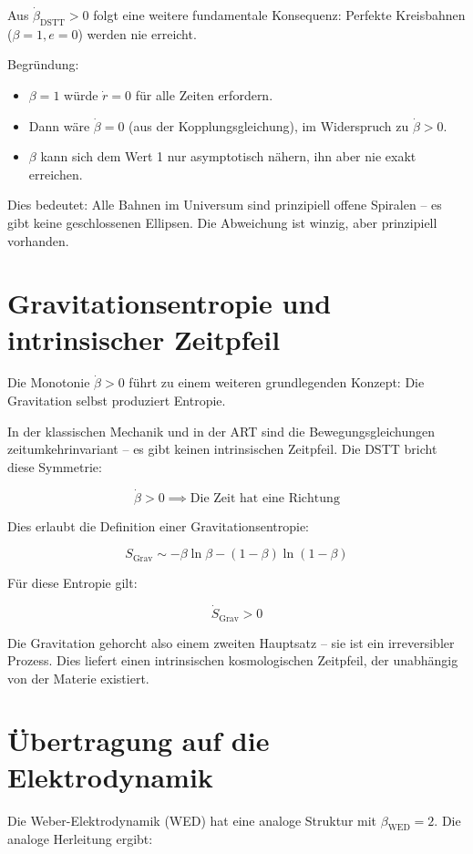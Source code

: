 Aus \(\dot{\beta}_{\text{DSTT}} > 0\) folgt eine weitere fundamentale Konsequenz: Perfekte Kreisbahnen (\(\beta = 1, e = 0\)) werden nie erreicht.

Begründung:
\begin{itemize}
    \item \(\beta = 1\) würde \(\dot{r} = 0\) für alle Zeiten erfordern.
    \item Dann wäre \(\dot{\beta} = 0\) (aus der Kopplungsgleichung), im Widerspruch zu \(\dot{\beta} > 0\).
    \item \(\beta\) kann sich dem Wert 1 nur asymptotisch nähern, ihn aber nie exakt erreichen.
\end{itemize}

Dies bedeutet: Alle Bahnen im Universum sind prinzipiell offene Spiralen – es gibt keine geschlossenen Ellipsen. Die Abweichung ist winzig, aber prinzipiell vorhanden.

\section{Gravitationsentropie und intrinsischer Zeitpfeil}
\label{sec:gravitationsentropie}

Die Monotonie \(\dot{\beta} > 0\) führt zu einem weiteren grundlegenden Konzept: Die Gravitation selbst produziert Entropie.

In der klassischen Mechanik und in der ART sind die Bewegungsgleichungen zeitumkehrinvariant – es gibt keinen intrinsischen Zeitpfeil. Die DSTT bricht diese Symmetrie:

\[
\dot{\beta} > 0 \implies \text{Die Zeit hat eine Richtung}
\]

Dies erlaubt die Definition einer Gravitationsentropie:

\[
S_{\text{Grav}} \sim -\beta \ln \beta - (1-\beta)\ln(1-\beta)
\]

Für diese Entropie gilt:

\[
\dot{S}_{\text{Grav}} > 0
\]

Die Gravitation gehorcht also einem zweiten Hauptsatz – sie ist ein irreversibler Prozess. Dies liefert einen intrinsischen kosmologischen Zeitpfeil, der unabhängig von der Materie existiert.

\section{Übertragung auf die Elektrodynamik}
\label{sec:dstt_elektrodynamik}

Die Weber-Elektrodynamik (WED) hat eine analoge Struktur mit \(\beta_{\text{WED}} = 2\). Die analoge Herleitung ergibt:

